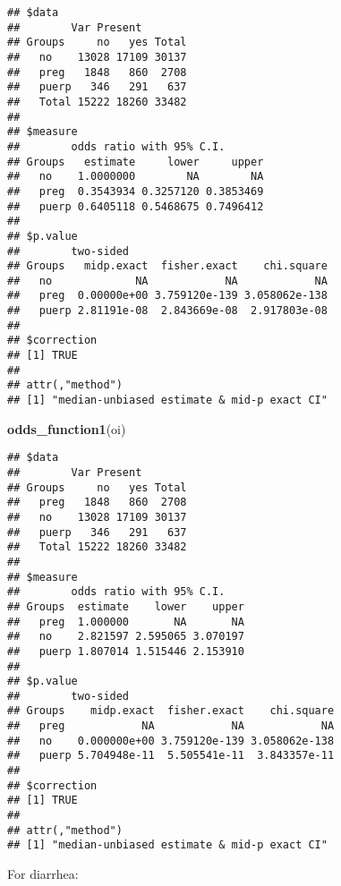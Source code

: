 \documentclass[
]{article}
\newenvironment{Shaded}{\begin{snugshade}}{\end{snugshade}}
\newcommand{\DataTypeTok}[1]{\textcolor[rgb]{0.13,0.29,0.53}{#1}}
\newcommand{\KeywordTok}[1]{\textcolor[rgb]{0.13,0.29,0.53}{\textbf{#1}}}
\newcommand{\NormalTok}[1]{#1}
\newcommand{\OperatorTok}[1]{\textcolor[rgb]{0.81,0.36,0.00}{\textbf{#1}}}
\newcommand{\OtherTok}[1]{\textcolor[rgb]{0.56,0.35,0.01}{#1}}
\newcommand{\StringTok}[1]{\textcolor[rgb]{0.31,0.60,0.02}{#1}}
\begin{document}
\begin{verbatim}
## $data
##        Var Present
## Groups     no   yes Total
##   no    13028 17109 30137
##   preg   1848   860  2708
##   puerp   346   291   637
##   Total 15222 18260 33482
## 
## $measure
##        odds ratio with 95% C.I.
## Groups   estimate     lower     upper
##   no    1.0000000        NA        NA
##   preg  0.3543934 0.3257120 0.3853469
##   puerp 0.6405118 0.5468675 0.7496412
## 
## $p.value
##        two-sided
## Groups   midp.exact  fisher.exact    chi.square
##   no             NA            NA            NA
##   preg  0.00000e+00 3.759120e-139 3.058062e-138
##   puerp 2.81191e-08  2.843669e-08  2.917803e-08
## 
## $correction
## [1] TRUE
## 
## attr(,"method")
## [1] "median-unbiased estimate & mid-p exact CI"
\end{verbatim}

\begin{Shaded}
\begin{Highlighting}[]
\KeywordTok{odds_function1}\NormalTok{(oi)}
\end{Highlighting}
\end{Shaded}

\begin{verbatim}
## $data
##        Var Present
## Groups     no   yes Total
##   preg   1848   860  2708
##   no    13028 17109 30137
##   puerp   346   291   637
##   Total 15222 18260 33482
## 
## $measure
##        odds ratio with 95% C.I.
## Groups  estimate    lower    upper
##   preg  1.000000       NA       NA
##   no    2.821597 2.595065 3.070197
##   puerp 1.807014 1.515446 2.153910
## 
## $p.value
##        two-sided
## Groups    midp.exact  fisher.exact    chi.square
##   preg            NA            NA            NA
##   no    0.000000e+00 3.759120e-139 3.058062e-138
##   puerp 5.704948e-11  5.505541e-11  3.843357e-11
## 
## $correction
## [1] TRUE
## 
## attr(,"method")
## [1] "median-unbiased estimate & mid-p exact CI"
\end{verbatim}

For diarrhea:

\begin{Shaded}
\end{Shaded}
\end{document}
